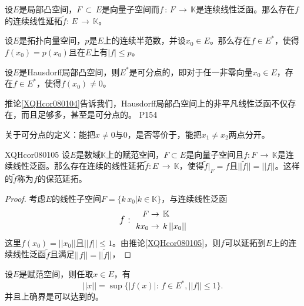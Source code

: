 \begin{corollary}
	设$E$是局部凸空间，$F\,\subset \, E $是向量子空间而$f\,: \,F\, \rightarrow \, \mathbb{K} $是连续线性泛函。那么存在$f$的连续线性延拓$\tilde{f}:\,E\,\rightarrow \, \mathbb{K} $。
\end{corollary}

\begin{corollary}
	设$E$是拓扑向量空间，$p$是$E$上的连续半范数，并设$x_{0}\in E$。那么存在$f\in E^{*} $，使得$f(x_{0})=p(x_{0}) $且在$E$上有$|f|\leq p $。
\end{corollary}

\begin{corollary}\label{XQHcor080104}
	设$E$是Hausdorff局部凸空间，则$E^{*}$是可分点的，即对于任一非零向量$x_{0} \in E$，存在$f\in E^{*} $，使得$f(x_{0})\neq 0 $。
\end{corollary}

\original
{
	推论\ref{XQHcor080104}告诉我们，Hausdorff局部凸空间上的非平凡线性泛函不仅存在，而且足够多，甚至是可分点的。
}
{P154}

\begin{proposition}
	关于可分点的定义：能把$x\neq 0$与$0$，是否等价于，能把$x_{1}\neq x_{2} $两点分开。
\end{proposition}

\begin{corollary}{XQHcor080105}
	设$E$是数域$\mathbb{K}$上的赋范空间，$F\subset E $是向量子空间且$f:F\, \rightarrow \, \mathbb{K} $是连续线性泛函。那么存在连续的线性延拓$\tilde{f} : E\, \rightarrow \, \mathbb{K} $，使得$\tilde{f}\big|_{F}=f  $且$||\tilde{f}||=||f|| $。这样的$\tilde{f} $称为$f $的保范延拓。
\end{corollary}


\begin{proof}
	考虑$E$的线性子空间$F=\{k\, x_{0}\big| k\in \mathbb{K} \} $，与连续线性泛函
	\begin{equation*}
		{\large\text{$f:$}}\,\,\,\,
		\begin{aligned}
			F& \rightarrow \, \mathbb{K}\\
			kx_{0}& \rightarrow \, k\, ||x_{0}||
		\end{aligned}
	\end{equation*}
	这里$f(x_{0})=||x_{0}||$且$||f||\leq 1$。由推论\ref{XQHcor080105}，则$f$可以延拓到$E$上的连续线性泛函$\tilde{f} $且满足$||f||=||\tilde{f}|| $，

\end{proof}


\begin{corollary}
	设$E$是赋范空间，则任取$x\in E $，有
	\begin{equation*}
		||x||=\sup \{|f(x)|:\, f\in E^{*},||f||\leq 1 \}.
	\end{equation*}
	并且上确界是可以达到的。
\end{corollary}















